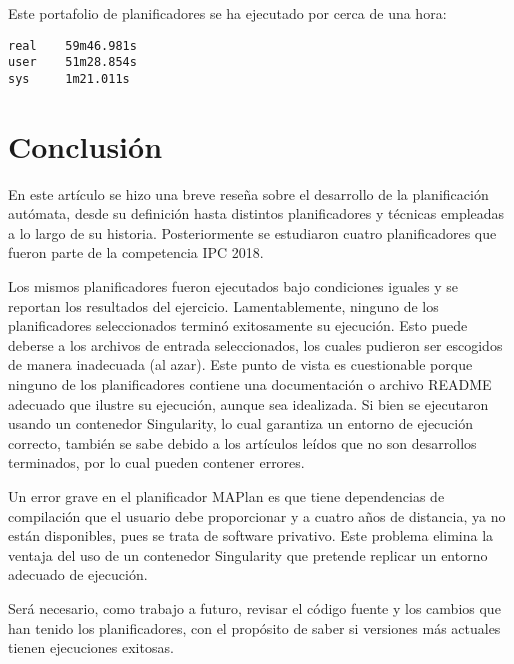 \documentclass[a4paper,12pt,twocolumn]{article}
\begin{document}
Este portafolio de planificadores se ha ejecutado por cerca de una hora:

\begin{lstlisting}[style=consola]
real    59m46.981s
user    51m28.854s
sys     1m21.011s  
\end{lstlisting}

\section{Conclusión}

En este artículo se hizo una breve reseña sobre el desarrollo de la planificación autómata, desde su definición hasta distintos planificadores y técnicas empleadas a lo largo de su historia. Posteriormente se estudiaron cuatro planificadores que fueron parte de la competencia IPC 2018.

Los mismos planificadores fueron ejecutados bajo condiciones iguales y se reportan los resultados del ejercicio. Lamentablemente, ninguno de los planificadores seleccionados terminó exitosamente su ejecución. Esto puede deberse a los archivos de entrada seleccionados, los cuales pudieron ser escogidos de manera inadecuada (al azar). Este punto de vista es cuestionable porque ninguno de los planificadores contiene una documentación o archivo README adecuado que ilustre su ejecución, aunque sea idealizada. Si bien se ejecutaron usando un contenedor Singularity, lo cual garantiza un entorno de ejecución correcto, también se sabe debido a los artículos leídos que no son desarrollos terminados, por lo cual pueden contener errores.

Un error grave en el planificador MAPlan es que tiene dependencias de compilación que el usuario debe proporcionar y a cuatro años de distancia, ya no están disponibles, pues se trata de software privativo. Este problema elimina la ventaja del uso de un contenedor Singularity que pretende replicar un entorno adecuado de ejecución.

Será necesario, como trabajo a futuro, revisar el código fuente y los cambios que han tenido los planificadores, con el propósito de saber si versiones más actuales tienen ejecuciones exitosas.



\end{document}
